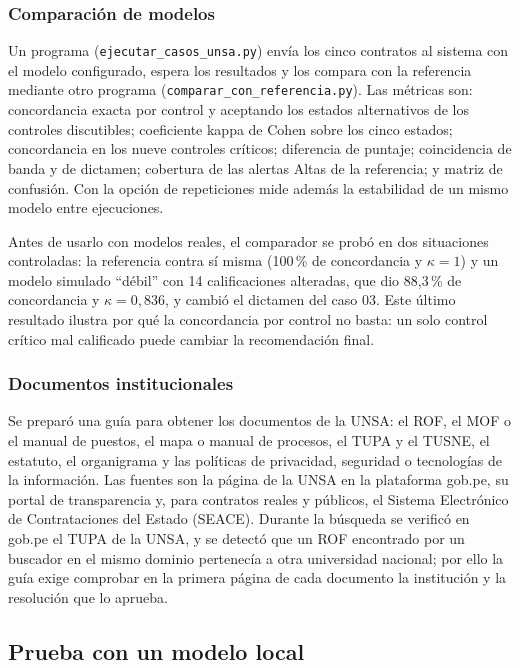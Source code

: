 \documentclass[12pt,letterpaper]{article}
\begin{document}
\subsubsection{Comparación de modelos}

Un programa (\texttt{ejecutar\_casos\_unsa.py}) envía los cinco contratos al sistema con el modelo configurado, espera los resultados y los compara con la referencia mediante otro programa (\texttt{comparar\_con\_referencia.py}). Las métricas son: concordancia exacta por control y aceptando los estados alternativos de los controles discutibles; coeficiente kappa de Cohen sobre los cinco estados; concordancia en los nueve controles críticos; diferencia de puntaje; coincidencia de banda y de dictamen; cobertura de las alertas Altas de la referencia; y matriz de confusión. Con la opción de repeticiones mide además la estabilidad de un mismo modelo entre ejecuciones.

Antes de usarlo con modelos reales, el comparador se probó en dos situaciones controladas: la referencia contra sí misma (100\,\% de concordancia y $\kappa = 1$) y un modelo simulado ``débil'' con 14 calificaciones alteradas, que dio 88,3\,\% de concordancia y $\kappa = 0{,}836$, y cambió el dictamen del caso 03. Este último resultado ilustra por qué la concordancia por control no basta: un solo control crítico mal calificado puede cambiar la recomendación final.

\subsubsection{Documentos institucionales}

Se preparó una guía para obtener los documentos de la UNSA: el ROF, el MOF o el manual de puestos, el mapa o manual de procesos, el TUPA y el TUSNE, el estatuto, el organigrama y las políticas de privacidad, seguridad o tecnologías de la información. Las fuentes son la página de la UNSA en la plataforma gob.pe, su portal de transparencia y, para contratos reales y públicos, el Sistema Electrónico de Contrataciones del Estado (SEACE). Durante la búsqueda se verificó en gob.pe el TUPA de la UNSA, y se detectó que un ROF encontrado por un buscador en el mismo dominio pertenecía a otra universidad nacional; por ello la guía exige comprobar en la primera página de cada documento la institución y la resolución que lo aprueba.

\subsection{Prueba con un modelo local}
\label{sec:prueba-local}
\end{document}
